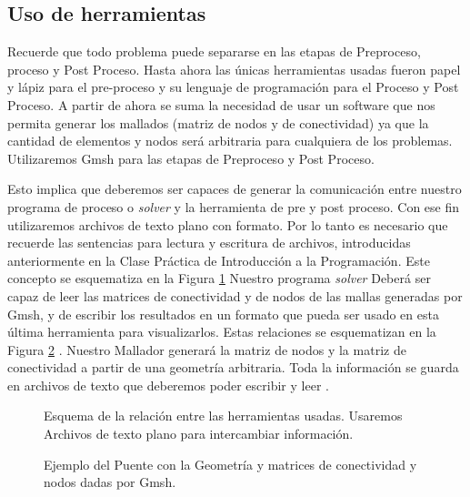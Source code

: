 \subsection{Uso de herramientas}

Recuerde que todo problema puede separarse en las etapas de 
Preproceso, proceso y Post Proceso. Hasta ahora las únicas 
herramientas usadas fueron papel y lápiz para el pre-proceso
y su lenguaje de programación para el Proceso y Post Proceso. 
A partir de ahora se suma la necesidad de usar un software
que nos permita generar los mallados (matriz de nodos y de 
conectividad) ya que la cantidad de elementos y nodos será 
arbitraria para cualquiera de los problemas. Utilizaremos
Gmsh para las etapas de Preproceso y Post Proceso.

Esto implica que deberemos ser capaces de generar la 
comunicación entre nuestro programa de proceso o \emph{solver}
y la herramienta de pre y post proceso. Con ese 
fin utilizaremos archivos de texto plano con formato. 
Por lo tanto es necesario que recuerde las sentencias para
lectura y escritura de archivos, introducidas anteriormente en
la Clase Práctica de Introducción a la Programación. Este 
concepto se esquematiza en la Figura \ref{FiguraComunicarHerramientas}
Nuestro programa \emph{solver} Deberá ser capaz de leer las 
matrices de conectividad y de nodos de las mallas generadas
por Gmsh, y de escribir los resultados en un formato que 
pueda ser usado en esta última herramienta para visualizarlos.
Estas relaciones se esquematizan en la Figura 
\ref{FiguraFlujoTrabajo} .
Nuestro Mallador generará la matriz de nodos y 
  la matriz de conectividad a partir de una geometría 
  arbitraria. Toda la información se guarda en archivos 
  de texto que deberemos poder escribir y leer .




\begin{figure}
  \caption{Esquema de la relación entre las herramientas 
  usadas. Usaremos Archivos de texto plano para intercambiar
  información. \label{FiguraComunicarHerramientas} }

\end{figure}

\begin{figure}
  \caption{ Ejemplo del Puente con la Geometría y
  matrices de conectividad y nodos dadas por Gmsh.
  \label{FiguraFlujoTrabajo}
  }
\end{figure}

